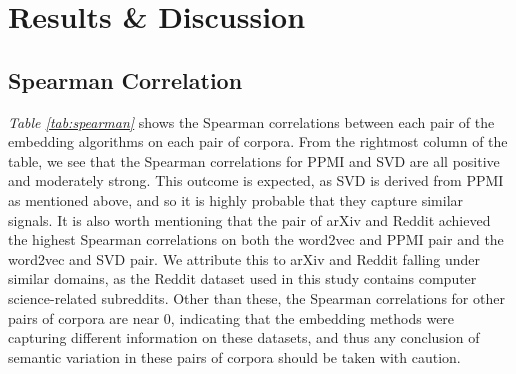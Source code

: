 \documentclass[11pt]{article}
\begin{document}
\section{Results \& Discussion} \label{sec:results}

\subsection{Spearman Correlation}

\begin{table}[t]
    \centering
    \caption{Spearman \( \rho \) on common vocabulary per pair}
    \label{tab:spearman}
\end{table}

\textit{Table \ref{tab:spearman}} shows the Spearman correlations between each pair of the embedding algorithms on each pair of corpora. From the rightmost column of the table, we see that the Spearman correlations for PPMI and SVD are all positive and moderately strong. This outcome is expected, as SVD is derived from PPMI as mentioned above, and so it is highly probable that they capture similar signals. It is also worth mentioning that the pair of arXiv and Reddit achieved the highest Spearman correlations on both the word2vec and PPMI pair and the word2vec and SVD pair. We attribute this to arXiv and Reddit falling under similar domains, as the Reddit dataset used in this study contains computer science-related subreddits. Other than these, the Spearman correlations for other pairs of corpora are near 0, indicating that the embedding methods were capturing different information on these datasets, and thus any conclusion of semantic variation in these pairs of corpora should be taken with caution.
\end{document}

